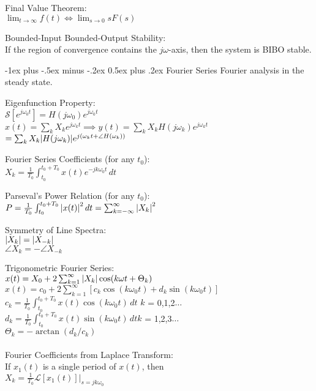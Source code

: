 \documentclass[12pt,landscape]{article}
\makeatletter
\renewcommand{\section}{\@startsection{section}{1}{0mm}%
                                {-1ex plus -.5ex minus -.2ex}%
                                {0.5ex plus .2ex}%
                                {\normalfont\normalsize\bfseries}}
\newcommand{\tab}{\hspace{.02\textwidth}}
\newcommand{\ds}{\displaystyle}
\makeatother
\begin{document}
\begin{multicols*}{3}
Final Value Theorem:\\
\tab $\ds \lim_{t\rightarrow\infty} f(t) \Leftrightarrow \lim_{s\rightarrow 0} sF(s)$

Bounded-Input Bounded-Output Stability:\\
\tab If the region of convergence contains the $j\omega$-axis, then the system is BIBO stable.

\section{Fourier Series}
\tab Fourier analysis in the steady state.

Eigenfunction Property:\\
\tab $\mathcal{S}[e^{j\omega_0t}] = H(j\omega_0)e^{j\omega_0t}$\\
\tab $x(t) = \sum_k X_k e^{j\omega_kt} \implies y(t) = \sum_k X_k H(j\omega_k)e^{j\omega_kt}$\\\vspace{1mm}\hspace{2.5cm}$= \sum_k X_k \abs{H(j\omega_k)}e^{j(\omega_kt + \angle H(\omega_k))}$

Fourier Series Coefficients (for any $t_0$):\\
\tab $X_k = \frac{1}{T_0}\int_{t_0}^{t_0 + T_0}x(t)e^{-jk\omega_0t}\,dt$

Parseval's Power Relation (for any $t_0$):\\
\tab $ P = \frac{1}{T_0} \int_{t_0}^{t_0 + T_0}\abs{x(t)}^2\,dt = \sum_{k = -\infty}^{\infty}\abs{X_k}^2$

Symmetry of Line Spectra:\\
\tab $\abs{X_k} = \abs{X_{-k}}$\\
\tab $\angle X_k = -\angle X_{-k}$

Trigonometric Fourier Series:\\
\tab $x(t) = X_0 + 2\sum_{k = 1}^{\infty}\abs{X_k}\cos(k\omega t + \Theta_k)$\\
\tab $x(t) = c_0 + 2\sum_{k = 1}^{\infty}[c_k\cos(k\omega_0 t) + d_k\sin(k\omega_0 t)]$\\
\tab $c_k = \frac{1}{T_0} \int_{t_0}^{t_0 + T_0}x(t)\cos(k\omega_0 t)\,dt$ \quad $k$ = 0,1,2$\ldots$\\
\tab $d_k = \frac{1}{T_0} \int_{t_0}^{t_0 + T_0}x(t)\sin(k\omega_0 t)\,dt$\quad $k$ = 1,2,3$\ldots$\\
\tab $\Theta_k = -\arctan(d_k/c_k)$
\\~\\
Fourier Coefficients from Laplace Transform:\\
\tab If $x_1(t)$ is a single period of $x(t)$, then\\
\tab $X_k = \frac{1}{T_0}\mathcal{L}[x_1(t)] \big\rvert_{s = jk\omega_0}$


\end{multicols*}
\end{document}
